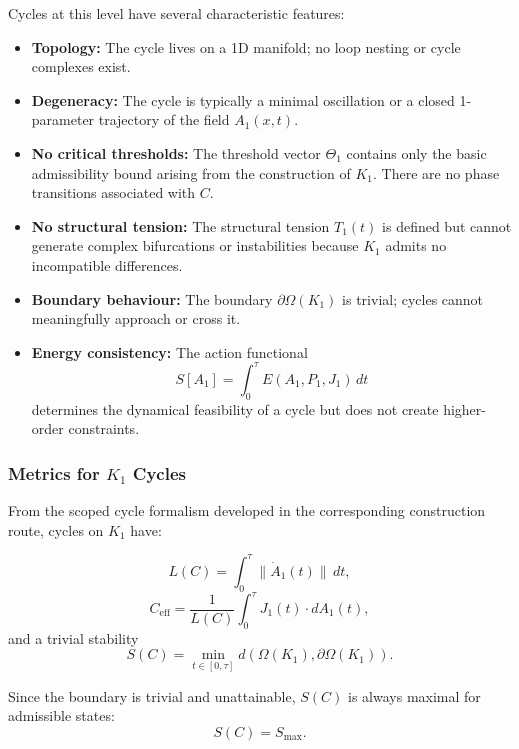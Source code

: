 Cycles at this level have several characteristic features:

\begin{itemize}
  \item \textbf{Topology:}
        The cycle lives on a 1D manifold; no loop nesting or cycle
        complexes exist.

  \item \textbf{Degeneracy:}
        The cycle is typically a minimal oscillation or a closed
        1-parameter trajectory of the field $A_1(x,t)$.

  \item \textbf{No critical thresholds:}
        The threshold vector $\Theta_1$ contains only the basic
        admissibility bound arising from the construction of $K_1$.
        There are no phase transitions associated with $C$.

  \item \textbf{No structural tension:}
        The structural tension
        $T_1(t)$ is defined but cannot generate complex bifurcations or
        instabilities because $K_1$ admits no incompatible differences.

  \item \textbf{Boundary behaviour:}
        The boundary $\partial\Omega(K_1)$ is trivial; cycles cannot
        meaningfully approach or cross it.

  \item \textbf{Energy consistency:}
        The action functional
        \[
          S[A_1] = \int_0^\tau E(A_1,P_1,J_1)\, dt
        \]
        determines the dynamical feasibility of a cycle but does not
        create higher-order constraints.
\end{itemize}

\subsubsection{Metrics for \texorpdfstring{$K_1$}{K_1} Cycles}

From the scoped cycle formalism developed in the corresponding construction route, cycles on $K_1$
have:

\[
  L(C) = \int_0^\tau \| \dot{A}_1(t) \|\, dt,
\]
\[
  C_{\mathrm{eff}} =
    \frac{1}{L(C)} \int_0^\tau J_1(t)\cdot dA_1(t),
\]
and a trivial stability
\[
  S(C) = \min_{t\in[0,\tau]} d(\Omega(K_1),\partial\Omega(K_1)).
\]

Since the boundary is trivial and unattainable, $S(C)$ is always
maximal for admissible states:
\[
  S(C) = S_{\max}.
\]

